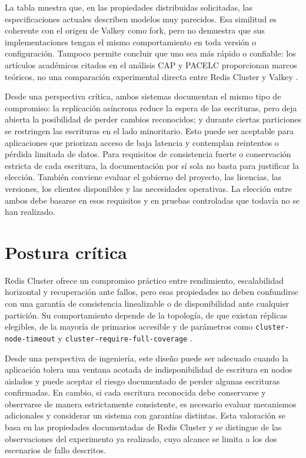 \documentclass[12pt,a4paper]{article}
\begin{document}
La tabla muestra que, en las propiedades distribuidas solicitadas, las especificaciones actuales describen modelos muy parecidos. Esa similitud es coherente con el origen de Valkey como fork, pero no demuestra que sus implementaciones tengan el mismo comportamiento en toda versión o configuración. Tampoco permite concluir que uno sea más rápido o confiable: los artículos académicos citados en el análisis CAP y PACELC proporcionan marcos teóricos, no una comparación experimental directa entre Redis Cluster y Valkey \cite{gilbert2002brewer,abadi2012consistency}.

Desde una perspectiva crítica, ambos sistemas documentan el mismo tipo de compromiso: la replicación asíncrona reduce la espera de las escrituras, pero deja abierta la posibilidad de perder cambios reconocidos; y durante ciertas particiones se restringen las escrituras en el lado minoritario. Esto puede ser aceptable para aplicaciones que priorizan acceso de baja latencia y contemplan reintentos o pérdida limitada de datos. Para requisitos de consistencia fuerte o conservación estricta de cada escritura, la documentación por sí sola no basta para justificar la elección. También conviene evaluar el gobierno del proyecto, las licencias, las versiones, los clientes disponibles y las necesidades operativas. La elección entre ambos debe basarse en esos requisitos y en pruebas controladas que todavía no se han realizado.

\section{Postura crítica}

Redis Cluster ofrece un compromiso práctico entre rendimiento, escalabilidad horizontal y recuperación ante fallos, pero esas propiedades no deben confundirse con una garantía de consistencia linealizable o de disponibilidad ante cualquier partición. Su comportamiento depende de la topología, de que existan réplicas elegibles, de la mayoría de primarios accesible y de parámetros como \texttt{cluster-node-timeout} y \texttt{cluster-require-full-coverage} \cite{redisClusterSpec,redisClusterScaling}.

Desde una perspectiva de ingeniería, este diseño puede ser adecuado cuando la aplicación tolera una ventana acotada de indisponibilidad de escritura en nodos aislados y puede aceptar el riesgo documentado de perder algunas escrituras confirmadas. En cambio, si cada escritura reconocida debe conservarse y observarse de manera estrictamente consistente, es necesario evaluar mecanismos adicionales y considerar un sistema con garantías distintas. Esta valoración se basa en las propiedades documentadas de Redis Cluster y se distingue de las observaciones del experimento ya realizado, cuyo alcance se limita a los dos escenarios de fallo descritos.
\end{document}
